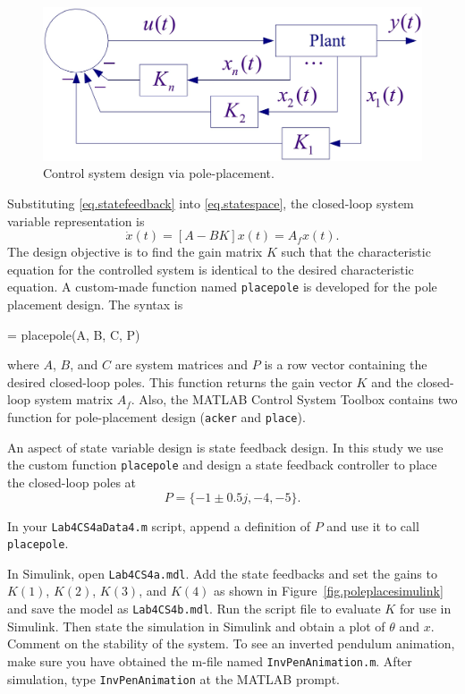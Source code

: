 \begin{figure}[bht]
\centering
\includegraphics[width=.6\textwidth]{StateFeedbackSystem}
\caption{\footnotesize
        Control system design via pole-placement.
        \label{fig.poleplacesys}
        }
\end{figure}

Substituting \eqref{eq.statefeedback} into \eqref{eq.statespace}, the closed-loop system variable representation is
\begin{equation}
    \dot{x}(t) = [A-BK]x(t) = A_f x(t).
\end{equation}
The design objective is to find the gain matrix $K$ such that the characteristic equation for the controlled system is identical to the desired characteristic equation.  A custom-made function named \texttt{placepole} is developed for the pole placement design.  The syntax is
\begin{codex}
[K, Af] = placepole(A, B, C, P)
\end{codex}
where $A$, $B$, and $C$ are system matrices and $P$ is a row vector containing the desired closed-loop poles.  This function returns the gain vector $K$ and the closed-loop system matrix $A_f$.  Also, the MATLAB Control System Toolbox contains two function for pole-placement design (\texttt{acker} and \texttt{place}).
\par
An aspect of state variable design is state feedback design.  In this study we use the custom function \texttt{placepole} and design a state feedback controller to place the closed-loop poles at
\begin{equation*}
    P = \{-1\pm 0.5j, -4, -5\}.
\end{equation*}
\par
In your \texttt{Lab4CS4aData4.m} script, append a definition of $P$ and use it to call \texttt{placepole}.
\par
In Simulink, open \texttt{Lab4CS4a.mdl}.  Add the state feedbacks and set the gains to $K(1)$, $K(2)$, $K(3)$, and $K(4)$ as shown in Figure~\ref{fig.poleplacesimulink} and save the model as \texttt{Lab4CS4b.mdl}.  Run the script file to evaluate $K$ for use in Simulink.  Then state the simulation in Simulink and obtain a plot of $\theta$ and $x$.  Comment on the stability of the system.  To see an inverted  pendulum animation, make sure you have obtained the m-file named \texttt{InvPenAnimation.m}.  After simulation, type \texttt{InvPenAnimation} at the MATLAB prompt.


